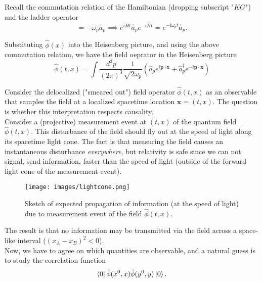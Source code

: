\noindent Recall the commutation relation of the Hamiltonian (dropping subscript "$KG$") and the ladder operator
\begin{equation}
[ \hat{H}, \hat{a}_p ] = -\omega_p \hat{a}_p \implies e^{i \hat{H} t} \hat{a}_p e^{-i \hat{H} t} = e^{-i\omega_p t} \hat{a}_p.
\end{equation} 

\noindent Substituting $\hat{\phi}(x)$ into the Heisenberg picture, and using the above commutation relation, we have the field oeprator in the Heisenberg picture
\begin{equation}
\hat{\phi}(t, x) = \int \frac{d^3 p}{(2\pi)^3} \frac{1}{\sqrt{2 \omega_p}} \left( \hat{a}_p e^{i \textbf{p} \cdot \textbf{x}} + \hat{a}_p^\dagger e^{-i \textbf{p} \cdot \textbf{x}} \right)
\end{equation}

\noindent Consider the delocalized ("smeared out") field operator $\hat{\phi}(t,x)$ as an observable that samples the field at a localized spacetime location $\textbf{x}=(t,x)$. The question is whether this interpretation respects causality. \\

\noindent Consider a (projective) measurement event at $(t,x)$ of the quantum field $\hat{\phi}(t,x)$. This disturbance of the field should fly out at the speed of light along its spacetime light cone. The fact is that measuring the field causes an instantaneous disturbance \textit{everywhere}, but relativity is safe since we can not signal, send information, faster than the speed of light (outside of the forward light cone of the measurement event). \\

\begin{figure}[H]
	\centering
	\texttt{[image: images/lightcone.png]}
	\caption{Sketch of expected propagation of information (at the speed of light) due to measurement event of the field $\hat{\phi}(t,x)$.}
\end{figure}

\noindent The result is that no information may be transmitted via the field across a space-like interval ($(x_A - x_B)^2 < 0$). \\

\noindent Now, we have to agree on which quantities are observable, and a natural guess is to study the correlation function
\begin{equation}
\bra{0} \hat{\phi}(x^0,x) \hat{\phi}(y^0,y) \ket{0}.
\end{equation}

